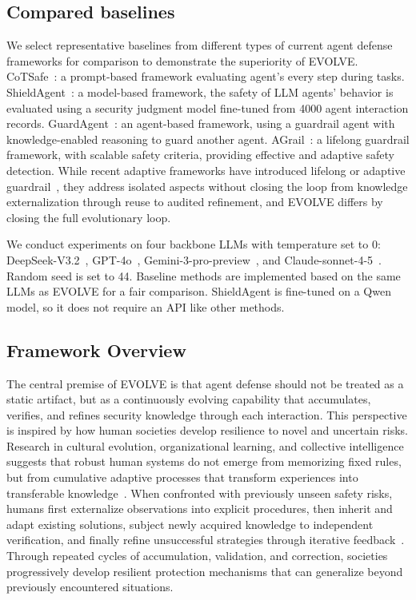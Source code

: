   \subsection{Compared baselines} 
  We select representative baselines from different types of current agent defense frameworks for comparison to demonstrate the superiority of EVOLVE.  CoTSafe~\citep{yin2024safeagentbench}: a prompt-based framework evaluating agent's every step during tasks.  ShieldAgent~\citep{zhang2024asb}: a model-based framework, the safety of LLM agents' behavior is evaluated using a security judgment model fine-tuned from 4000 agent interaction records.  GuardAgent~\citep{xiang2024guardagent}: an agent-based framework, using a guardrail agent with knowledge-enabled reasoning to guard another agent.  AGrail~\citep{luo2025agrail}: a lifelong guardrail framework, with scalable safety criteria, providing effective and adaptive safety detection. While recent adaptive frameworks have introduced lifelong or adaptive guardrail~\citep{luo2025agrail,xiang2024guardagent}, they address isolated aspects without closing the loop from knowledge externalization through reuse to audited refinement, and EVOLVE differs by closing the full evolutionary loop.
  
  We conduct experiments on four backbone LLMs with temperature set to 0: DeepSeek-V3.2~\citep{liu2024deepseek}, GPT-4o~\citep{achiam2023gpt}, Gemini-3-pro-preview~\citep{team2023gemini}, and Claude-sonnet-4-5~\citep{anthropic2025claude}. Random seed is set to 44. Baseline methods are implemented based on the same LLMs as EVOLVE for a fair comparison. ShieldAgent is fine-tuned on a Qwen model, so it does not require an API like other methods.

  \subsection{Framework Overview}


The central premise of EVOLVE is that agent defense should not be treated as a static artifact, but as a continuously evolving capability that accumulates, verifies, and refines security knowledge through each interaction. This perspective is inspired by how human societies develop resilience to novel and uncertain risks. Research in cultural evolution, organizational learning, and collective intelligence suggests that robust human systems do not emerge from memorizing fixed rules, but from cumulative adaptive processes that transform experiences into transferable knowledge~\citep{boyd1988culture,henrich2015secret,tomasello2009cultural}. When confronted with previously unseen safety risks, humans first externalize observations into explicit procedures, then inherit and adapt existing solutions, subject newly acquired knowledge to independent verification, and finally refine unsuccessful strategies through iterative feedback~\citep{argyris1997organizational,weick2011managing}. Through repeated cycles of accumulation, validation, and correction, societies progressively develop resilient protection mechanisms that can generalize beyond previously encountered situations.

